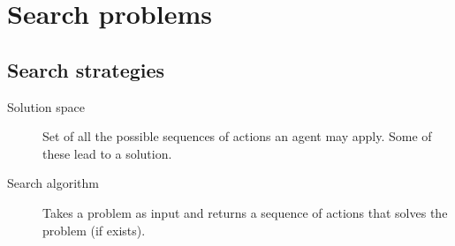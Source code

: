 \chapter{Search problems}



\section{Search strategies}
\begin{description}
    \item[Solution space] 
        Set of all the possible sequences of actions an agent may apply.
        Some of these lead to a solution.
    
    \item[Search algorithm] 
        Takes a problem as input and returns a sequence of actions that solves the problem (if exists).
\end{description}


